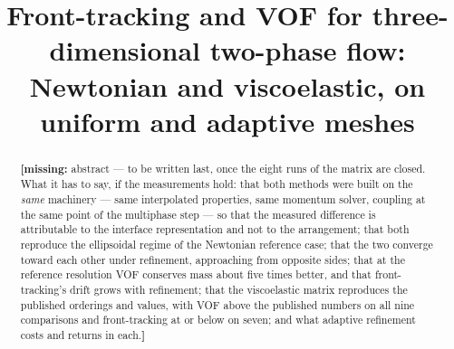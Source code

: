 \documentclass[11pt,a4paper]{article}
\title{Front-tracking and VOF for three-dimensional two-phase flow:\\
       \large Newtonian and viscoelastic, on uniform and adaptive meshes}
\author{\missing{authors}}
\date{\missing{date}}
\newcommand{\missing}[1]{\textcolor{red!70!black}{\textbf{[missing:} #1\textbf{]}}}
\begin{document}
\maketitle

\begin{abstract}
\missing{abstract --- to be written last, once the eight runs of the matrix are
closed. What it has to say, if the measurements hold: that both methods were
built on the \emph{same} machinery --- same interpolated properties, same
momentum solver, coupling at the same point of the multiphase step --- so that
the measured difference is attributable to the interface representation and not
to the arrangement; that both reproduce the ellipsoidal regime of the Newtonian
reference case; that the two converge toward each other under refinement,
approaching from opposite sides; that at the reference resolution VOF conserves
mass about five times better, and that front-tracking's drift grows with
refinement; that the viscoelastic matrix reproduces the published orderings and
values, with VOF above the published numbers on all nine comparisons and
front-tracking at or below on seven; and what adaptive refinement costs and
returns in each.}
\end{abstract}

\tableofcontents










\nocite{*}


\end{document}
